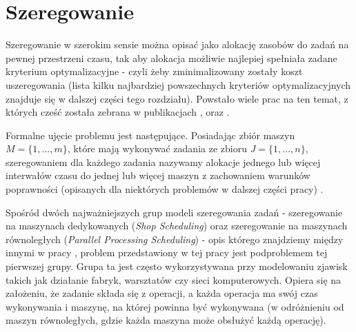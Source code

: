 \documentclass[brudnopis]{xmgr}
\begin{document}
\section{Szeregowanie}
Szeregowanie w szerokim sensie można opisać jako alokację zasobów do zadań na pewnej przestrzeni czasu, tak aby alokacja możliwie najlepiej spełniała zadane kryterium optymalizacyjne - czyli żeby zminimalizowany zostały koszt uszeregowania (lista kilku najbardziej powszechnych kryteriów optymalizacyjnych znajduje się w dalszej części tego rozdziału). Powstało wiele prac na ten temat, z których cześć została zebrana w publikacjach \cite{graves1981review}, \cite{lawler1993sequencing} oraz \cite{lee1997current}.
\medskip

Formalne ujęcie problemu jest następujące. Posiadając zbiór maszyn $M=\{1, ..., m\}$, które mają wykonywać zadania ze zbioru $J=\{1, ..., n\}$, szeregowaniem dla każdego zadania nazywamy alokacje jednego lub więcej interwałów czasu do jednej lub więcej maszyn z zachowaniem warunków poprawności (opisanych dla niektórych problemów w dalszej części pracy) \cite{brucker2007scheduling}.
\medskip


Spośród dwóch najważniejszych grup modeli szeregowania zadań - szeregowanie na maszynach dedykowanych (\emph{Shop Scheduling}) oraz szeregowanie na maszynach równoległych (\emph{Parallel Processing Scheduling}) - opis którego znajdziemy między innymi w pracy \cite{drozdowski2009scheduling}, problem przedstawiony w tej pracy jest podproblemem tej pierwszej grupy. Grupa ta jest często wykorzystywana przy modelowaniu zjawisk takich jak działanie fabryk, warsztatów czy sieci komputerowych.
Opiera się na założeniu, że zadanie składa się z operacji, a każda operacja ma swój czas wykonywania i maszynę, na której powinna być wykonywana (w odróżnieniu od maszyn równoległych, gdzie każda maszyna może obsłużyć każdą operację).
\medskip
\end{document}
